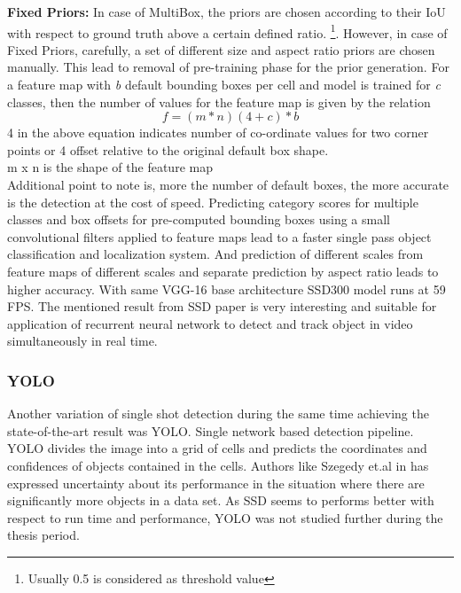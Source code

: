 \textbf{Fixed Priors:} In case of MultiBox, the priors are chosen according to their IoU with respect to ground truth above a certain defined ratio. \footnote{Usually 0.5 is considered as threshold value}.
However, in case of Fixed Priors, carefully, a set of different size and aspect ratio priors are chosen manually. This lead to removal of pre-training phase for the prior generation. For a feature map with \textit{b} default bounding boxes per cell and model is trained for \textit{c} classes, then the number of values for the feature map is given by the relation 
\begin{equation}
	f = (m * n )  (4 + c) * b
\end {equation}
4 in the above equation indicates number of co-ordinate values for two corner points or 4 offset relative to the original default box shape. \\
m x n is the shape of the feature map \\
 Additional point to note is, more the number of default boxes, the more accurate is the detection at the cost of speed.
Predicting category scores for multiple classes and box offsets for pre-computed bounding boxes using a small convolutional filters applied to feature maps lead to a faster single pass object classification and localization system. And prediction of different scales from feature maps of different scales and separate prediction by aspect ratio leads to higher accuracy. \cite{liu2016ssd} With same VGG-16 base architecture SSD300 model runs at 59 FPS. The mentioned result from SSD paper is very interesting and suitable for application of recurrent neural network to detect and track object in video simultaneously in real time.

\subsubsection{YOLO}
Another variation of single shot detection during the same time achieving the state-of-the-art result was YOLO. Single network based detection pipeline. YOLO divides the image into a grid of cells and predicts the coordinates and confidences of objects contained in the cells. Authors like Szegedy et.al in \cite{szegedy2014scalable} has expressed uncertainty about its performance in the situation where there are significantly more objects in a data set. As SSD seems to performs better with respect to run time and performance, YOLO was not studied further during the thesis period.

